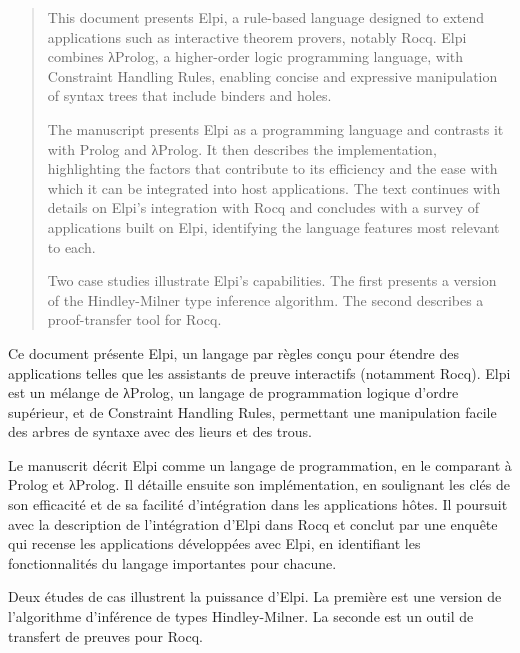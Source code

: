 \documentclass{these-ISSS}
\begin{document}
\def\resumename{Résumé} \begin{ResumeMotsCles} 

\begin{abstract}
This document presents Elpi, a rule-based language designed to extend
applications such as interactive theorem provers, notably Rocq. Elpi
combines λProlog, a higher-order logic programming language, with
Constraint Handling Rules, enabling concise and expressive manipulation of
syntax trees that include binders and holes.

The manuscript presents Elpi as a programming language and contrasts it
with Prolog and λProlog. It then describes the implementation, highlighting
the factors that contribute to its efficiency and the ease with which it can
be integrated into host applications. The text continues with details on
Elpi's integration with Rocq and concludes with a survey of applications
built on Elpi, identifying the language features most relevant to each.

Two case studies illustrate Elpi's capabilities. The first presents a
version of the Hindley-Milner type inference algorithm. The second describes
a proof-transfer tool for Rocq.
\end{abstract}

\begin{resume}
Ce document présente Elpi, un langage par règles
conçu pour étendre des applications telles que les assistants de preuve
interactifs (notamment Rocq). Elpi est un mélange de
λProlog, un langage de programmation logique d'ordre supérieur, et de
Constraint Handling Rules, permettant une manipulation facile des arbres
de syntaxe avec des lieurs et des trous.

Le manuscrit décrit Elpi comme un langage de programmation,
en le comparant à Prolog et λProlog. Il détaille ensuite
son implémentation, en soulignant les clés de son efficacité et
de sa facilité d'intégration dans les applications hôtes. Il poursuit avec
la description de l'intégration d'Elpi dans Rocq et conclut par
une enquête qui recense les applications développées avec Elpi,
en identifiant les fonctionnalités du langage importantes pour chacune.

Deux études de cas illustrent la puissance d'Elpi. La première est
une version de l'algorithme d'inférence de types Hindley-Milner.
La seconde est un outil de transfert de preuves pour Rocq.
\end{resume}


\end{ResumeMotsCles}
\end{document}
